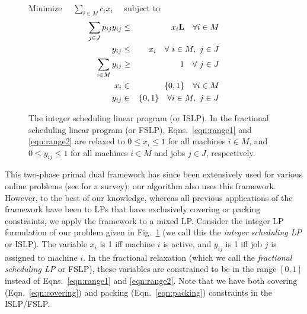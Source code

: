 \documentclass[11pt]{article}
\begin{document}
\begin{figure}[!htb]
	\centering
	\small
	Minimize $\quad\sum_{i\in M} c_i x_i\quad$ subject to
	\begin{eqnarray}
		\label{eqn:packing}		\sum_{j\in J} p_{ij} y_{ij} & \leq &  x_i {\bf L} \quad \forall i\in M \\
		\label{eqn:fraction}		y_{ij} & \leq & x_i\quad \forall~i\in M,~j\in J \\
		\label{eqn:covering}		\sum_{i\in M} y_{ij} & \geq & 1\quad \forall~j\in J \\
		\label{eqn:range1}		x_i & \in & \{0, 1\} \quad \forall i\in M \\
		\label{eqn:range2}		y_{ij} & \in & \{0, 1\}\quad \forall i\in M,~j\in J 
	\end{eqnarray}
	\caption{\small The integer scheduling linear program (or ISLP). In the fractional scheduling linear
		program (or FSLP), Eqns.~\ref{eqn:range1} and \ref{eqn:range2} are relaxed to $0 \leq x_i \leq 1$
		for all machines $i\in M$, and $0\leq y_{ij}\leq 1$ for all machines $i\in M$ and jobs $j\in J$, 
		respectively.}
	\label{fig:lp}
\end{figure}

This two-phase primal dual framework has since been extensively  
used for various online problems (see \cite{BuchbinderN09b} for a survey);
our algorithm also uses this framework. However, to the best of our knowledge,
whereas all previous applications of the framework have been to LPs that have 
exclusively covering or packing constraints, we apply the framework to a mixed LP. 
Consider the integer LP formulation of our problem 
given in Fig.~\ref{fig:lp} (we call this the {\em integer scheduling LP} or ISLP). 
The variable $x_i$ is 1 iff machine $i$ is active, 
and $y_{ij}$ is 1 iff job $j$ is assigned to machine $i$. In the fractional
relaxation (which we call the {\em fractional scheduling LP} or FSLP), 
these variables are constrained to be in the range $[0, 1]$ 
instead of Eqns.~\ref{eqn:range1} and \ref{eqn:range2}. 
Note that we have both covering 
(Eqn.~\ref{eqn:covering}) and packing (Eqn.~\ref{eqn:packing}) constraints
in the ISLP/FSLP.
\end{document}
